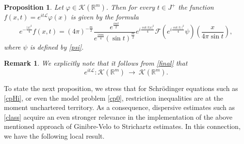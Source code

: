 \documentclass[11pt,a4paper]{amsart}
\def \vf{\varphi}
\newcommand{\Rm}{\mathbb R^m}
\numberwithin{equation}{section}
\newtheorem{proposition}[theorem]{Proposition}
\newtheorem{remark}[theorem]{Remark}
\numberwithin{equation}{section}
\begin{document}
\begin{proposition}\label{P:semigroup}
Let $\vf\in \mathscr K(\Rm)$. Then for every $t\in J^+$ the function $f(x,t) = e^{i t \mathscr L} \vf(x)$ is given by the formula
\begin{equation}\label{final}
e^{- \frac{|x|^2}{4}} f(x,t) =  (4\pi
)^{-\frac{m}{2}}\frac{e^{\frac{imt}2}}{e^{\frac{i\pi m}{4}} (\sin t)^{\frac m2}} e^{i \frac{\cot t |x|^2}{4}} \mathscr F\left(e^{i \frac{\cot t |\cdot|^2}4} \psi\right)(\frac{x}{4 \pi \sin t}),
\end{equation}
where $\psi$ is defined by \eqref{psi}.
\end{proposition} 

\begin{remark}\label{R:stable}
We explicitly note that it follows from \eqref{final} that
\begin{equation}\label{nice}
e^{i t \mathscr L} : \mathscr K(\Rm)\ \longrightarrow\ \mathscr K(\Rm).
\end{equation}
\end{remark}

To state the next proposition, we stress that for Schr\"odinger equations such as \eqref{cpHi}, or even the model problem \eqref{cp0}, restriction inequalities are at the moment unchartered territory. As a consequence, dispersive estimates such as \eqref{class} acquire an even stronger relevance in the implementation of the above mentioned approach of Ginibre-Velo to Strichartz estimates. In this connection, we have the following local result.
 
\end{document}
